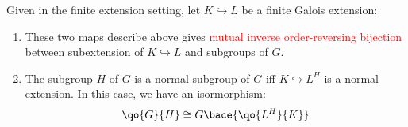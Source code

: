 \begin{theorem}
	Given in the finite extension setting, let \( K \hookrightarrow L \) be a finite Galois extension:
	\begin{enumerate}
		\item These two maps describe above gives \textcolor{red}{mutual inverse order-reversing bijection} between
		      subextension of \( K \hookrightarrow L \) and subgroups of \( G \).
		\item The subgroup \( H \) of \( G \) is a normal subgroup of \( G \) iff \( K \hookrightarrow
		      L^H \) is a normal extension. In this case, we have an isormorphism:
		      \[
			      \qo{G}{H} \cong G\bace{\qo{L^H}{K}}
		      \]
	\end{enumerate}
\end{theorem}

